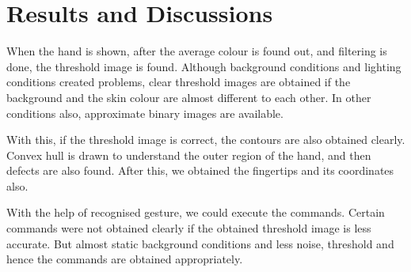 \documentclass[a4paper,11pt]{article}
\begin{document}
 	\section{Results and Discussions}
 		When the hand is shown, after the average colour is found out, and filtering is done, the threshold image is found. Although background conditions and lighting conditions created problems, clear threshold images are obtained if the background and the skin colour are almost different to each other. In other conditions also, approximate binary images are available.

 		With this, if the threshold image is correct, the contours are also obtained clearly. Convex hull is drawn to understand the outer region of the hand, and then defects are also found. After this, we obtained the fingertips and its coordinates also.

 		With the help of recognised gesture, we could execute the commands. Certain commands were not obtained clearly if the obtained threshold image is less accurate. But almost static background conditions and less noise, threshold and hence the commands are obtained appropriately. 
			
\end{document}

